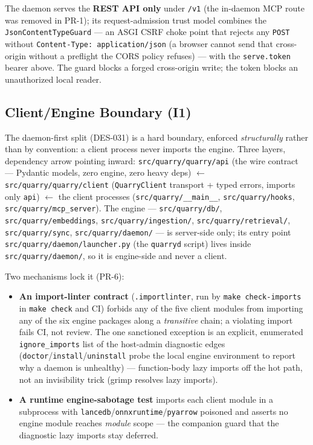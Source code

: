 \documentclass[a4paper,10pt]{article}
\newcommand{\modpath}[1]{\texttt{src/quarry/#1}}
\begin{document}
The daemon serves the \textbf{REST API only} under \texttt{/v1} (the
in-daemon MCP route was removed in PR-1); its request-admission trust model
combines the \texttt{JsonContentTypeGuard} --- an ASGI CSRF choke point
that rejects any \texttt{POST} without \texttt{Content-Type:
application/json} (a browser cannot send that cross-origin without a
preflight the CORS policy refuses) --- with the \texttt{serve.token} bearer
above.  The guard blocks a forged cross-origin write; the token blocks an
unauthorized local reader.

\subsection{Client/Engine Boundary (I1)}

The daemon-first split (DES-031) is a hard boundary, enforced
\emph{structurally} rather than by convention: a client process never
imports the engine.  Three layers, dependency arrow pointing inward:
\modpath{quarry/api} (the wire contract --- Pydantic models, zero engine,
zero heavy deps) $\leftarrow$ \modpath{quarry/client} (\texttt{QuarryClient}
transport + typed errors, imports only \texttt{api}) $\leftarrow$ the client
processes (\modpath{\_\_main\_\_}, \modpath{hooks}, \modpath{mcp\_server}).
The engine --- \modpath{db/}, \modpath{embeddings}, \modpath{ingestion/},
\modpath{retrieval/}, \modpath{sync}, \modpath{daemon/} --- is server-side
only; its entry point \modpath{daemon/launcher.py} (the \texttt{quarryd}
script) lives inside \modpath{daemon/}, so it is engine-side and never a
client.

Two mechanisms lock it (PR-6):

\begin{itemize}
  \item \textbf{An import-linter contract} (\texttt{.importlinter}, run by
    \texttt{make check-imports} in \texttt{make check} and CI) forbids any of
    the five client modules from importing any of the six engine packages
    along a \emph{transitive} chain; a violating import fails CI, not review.
    The one sanctioned exception is an explicit, enumerated
    \texttt{ignore\_imports} list of the host-admin diagnostic edges
    (\texttt{doctor}/\texttt{install}/\texttt{uninstall} probe the local engine
    environment to report why a daemon is unhealthy) --- function-body lazy
    imports off the hot path, not an invisibility trick (grimp resolves lazy
    imports).
  \item \textbf{A runtime engine-sabotage test} imports each client module in
    a subprocess with \texttt{lancedb}/\texttt{onnxruntime}/\texttt{pyarrow}
    poisoned and asserts no engine module reaches \emph{module} scope --- the
    companion guard that the diagnostic lazy imports stay deferred.
\end{itemize}
\end{document}
